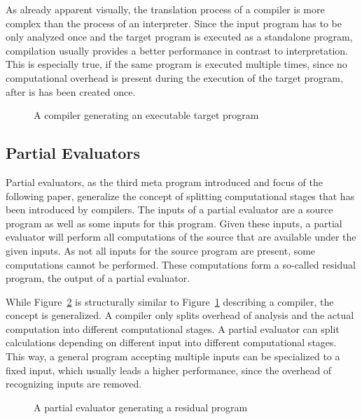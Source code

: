 As already apparent visually, the translation process of a compiler is more complex than the process of an interpreter.
Since the input program has to be only analyzed once and the target program is executed as a standalone program, compilation usually provides a better performance in contrast to interpretation.
This is especially true, if the same program is executed multiple times, since no computational overhead is present during the execution of the target program, after is has been created once.

\begin{figure}
  \centering
  \caption{A compiler generating an executable target program}\label{fig:compiled-program}
\end{figure}



\subsection{Partial Evaluators}

Partial evaluators, as the third meta program introduced and focus of the following paper, generalize the concept of splitting computational stages that has been introduced by compilers.
The inputs of a partial evaluator are a source program as well as some inputs for this program.
Given these inputs, a partial evaluator will perform all computations of the source that are available under the given inputs.
As not all inputs for the source program are present, some computations cannot be performed.
These computations form a so-called residual program, the output of a partial evaluator.

While Figure~\ref{fig:partial-evaluated-program} is structurally similar to Figure~\ref{fig:compiled-program} describing a compiler, the concept is generalized.
A compiler only splits overhead of analysis and the actual computation into different computational stages.
A partial evaluator can split calculations depending on different input into different computational stages.
This way, a general program accepting multiple inputs can be specialized to a fixed input, which usually leads a higher performance, since the overhead of recognizing inputs are removed.

\begin{figure}
  \centering
  \caption{A partial evaluator generating a residual program}\label{fig:partial-evaluated-program}
\end{figure}


